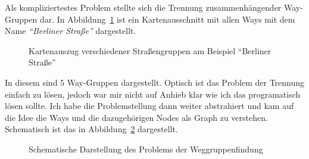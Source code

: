 Als kompliziertestes Problem stellte sich die Trennung zusammenhängender Way-Gruppen dar.
In Abbildung~\ref{fig:ose:osm_streetgroups_1} ist ein Kartenausschnitt mit allen Ways mit dem Name \textit{``Berliner Straße''} dargestellt.
\begin{figure}[htb]
   \centering
   \caption{Kartenauszug verschiedener Straßengruppen am Beispiel ``Berliner Straße''}
   \label{fig:ose:osm_streetgroups_1}
 \end{figure}
In diesem sind 5 Way-Gruppen dargestellt.
Optisch ist das Problem der Trennung einfach zu lösen, jedoch war mir nicht auf Anhieb klar wie ich das programatisch lösen sollte.
Ich habe die Problemstellung dann weiter abstrahiert und kam auf die Idee die Ways und die dazugehörigen Nodes als Graph zu verstehen. Schematisch ist das in Abbildung~\ref{fig:ose:osm_streetgroups_2} dargestellt.
\begin{figure}[htb]
   \centering
   \caption{Schematische Darstellung des Problems der Weggruppenfindung}
   \label{fig:ose:osm_streetgroups_2}
 \end{figure}
